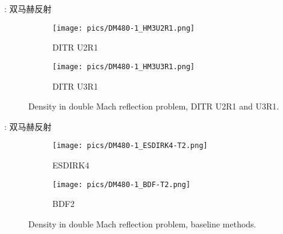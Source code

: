 \documentclass[aspectratio=169,serif]{beamer} %
\begin{document}
\begin{frame}{\secname: 双马赫反射}
  \scriptsize
  \begin{figure}[htbp]
    \centering
    \begin{subfigure}{0.5\textwidth}
      \texttt{[image: pics/DM480-1\_HM3U2R1.png]}
      \caption[]{DITR U2R1}
      \label{sfig:DM480_HM3U2R1}
    \end{subfigure}\hfill
    \begin{subfigure}{0.5\textwidth}
      \texttt{[image: pics/DM480-1\_HM3U3R1.png]}
      \caption[]{DITR U3R1}
      \label{sfig:DM480_HM3U3R1}
    \end{subfigure}
    \caption{Density in double Mach reflection problem, DITR U2R1 and U3R1.}
    \label{fig:DM480-2}
  \end{figure}
\end{frame}

\begin{frame}{\secname: 双马赫反射}
  \scriptsize
  \begin{figure}[htbp]
    \centering
    \begin{subfigure}{0.5\textwidth}
      \texttt{[image: pics/DM480-1\_ESDIRK4-T2.png]}
      \caption[]{ESDIRK4}
      \label{sfig:DM480_ESDIRK4}
    \end{subfigure}\hfill
    \begin{subfigure}{0.5\textwidth}
      \texttt{[image: pics/DM480-1\_BDF-T2.png]}
      \caption[]{BDF2}
      \label{sfig:DM480_BDF2}
    \end{subfigure}
    \caption{Density in double Mach reflection problem, baseline methods.}
    \label{fig:DM480-3}
  \end{figure}
\end{frame}



\end{document}
